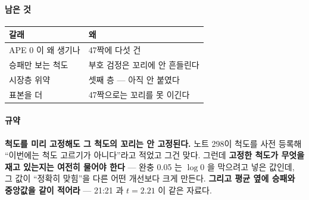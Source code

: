 \documentclass[10pt]{article}
\begin{document}
\paragraph{남은 것}
\begin{center}\small
\begin{tabular}{ll}
\hline
갈래 & 왜 \\
\hline
APE 0 이 왜 생기나 & 47짝에 다섯 건 \\
승패만 보는 척도 & 부호 검정은 꼬리에 안 흔들린다 \\
시장층 위약 & 셋째 층 --- 아직 안 붙였다 \\
표본을 더 & 47짝으로는 꼬리를 못 이긴다 \\
\hline
\end{tabular}
\end{center}

\paragraph{규약} \textbf{척도를 미리 고정해도 그 척도의 꼬리는 안 고정된다.}
노트 298이 척도를 사전 등록해 ``이번에는 척도 고르기가 아니다''라고 적었고
그건 맞다. 그런데 \textbf{고정한 척도가 무엇을 재고 있는지는 여전히 물어야
한다} --- 완충 0.05 는 $\log 0$ 을 막으려고 넣은 값인데, 그 값이 ``정확히
맞힘''을 다른 어떤 개선보다 크게 만든다. \textbf{그리고 평균 옆에 승패와
중앙값을 같이 적어라} --- 21:21 과 $t{=}2.21$ 이 같은 자료다.
\end{document}
